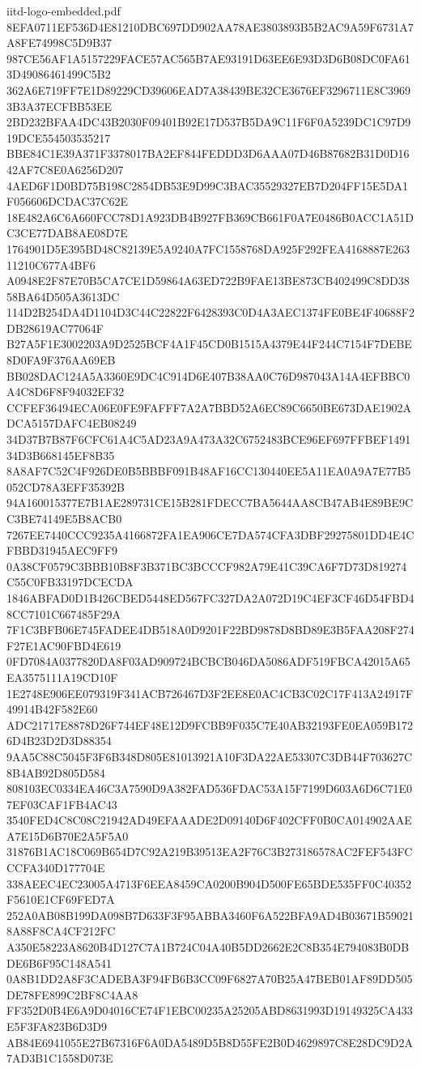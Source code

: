 \begin{filecontents*}[overwrite]{iitd-logo-embedded.pdf}
8EFA0711EF536D4E81210DBC697DD902AA78AE3803893B5B2AC9A59F6731A7A8FE74998C5D9B37
987CE56AF1A5157229FACE57AC565B7AE93191D63EE6E93D3D6B08DC0FA613D49086461499C5B2
362A6E719FF7E1D89229CD39606EAD7A38439BE32CE3676EF3296711E8C39693B3A37ECFBB53EE
2BD232BFAA4DC43B2030F09401B92E17D537B5DA9C11F6F0A5239DC1C97D919DCE554503535217
BBE84C1E39A371F3378017BA2EF844FEDDD3D6AAA07D46B87682B31D0D1642AF7C8E0A6256D207
4AED6F1D0BD75B198C2854DB53E9D99C3BAC35529327EB7D204FF15E5DA1F056606DCDAC37C62E
18E482A6C6A660FCC78D1A923DB4B927FB369CB661F0A7E0486B0ACC1A51DC3CE77DAB8AE08D7E
1764901D5E395BD48C82139E5A9240A7FC1558768DA925F292FEA4168887E26311210C677A4BF6
A0948E2F87E70B5CA7CE1D59864A63ED722B9FAE13BE873CB402499C8DD3858BA64D505A3613DC
114D2B254DA4D1104D3C44C22822F6428393C0D4A3AEC1374FE0BE4F40688F2DB28619AC77064F
B27A5F1E3002203A9D2525BCF4A1F45CD0B1515A4379E44F244C7154F7DEBE8D0FA9F376AA69EB
BB028DAC124A5A3360E9DC4C914D6E407B38AA0C76D987043A14A4EFBBC0A4C8D6F8F94032EF32
CCFEF36494ECA06E0FE9FAFFF7A2A7BBD52A6EC89C6650BE673DAE1902ADCA5157DAFC4EB08249
34D37B7B87F6CFC61A4C5AD23A9A473A32C6752483BCE96EF697FFBEF149134D3B668145EF8B35
8A8AF7C52C4F926DE0B5BBBF091B48AF16CC130440EE5A11EA0A9A7E77B5052CD78A3EFF35392B
94A160015377E7B1AE289731CE15B281FDECC7BA5644AA8CB47AB4E89BE9CC3BE74149E5B8ACB0
7267EE7440CCC9235A4166872FA1EA906CE7DA574CFA3DBF29275801DD4E4CFBBD31945AEC9FF9
0A38CF0579C3BBB10B8F3B371BC3BCCCF982A79E41C39CA6F7D73D819274C55C0FB33197DCECDA
1846ABFAD0D1B426CBED5448ED567FC327DA2A072D19C4EF3CF46D54FBD48CC7101C667485F29A
7F1C3BFB06E745FADEE4DB518A0D9201F22BD9878D8BD89E3B5FAA208F274F27E1AC90FBD4E619
0FD7084A0377820DA8F03AD909724BCBCB046DA5086ADF519FBCA42015A65EA3575111A19CD10F
1E2748E906EE079319F341ACB726467D3F2EE8E0AC4CB3C02C17F413A24917F49914B42F582E60
ADC21717E8878D26F744EF48E12D9FCBB9F035C7E40AB32193FE0EA059B1726D4B23D2D3D88354
9AA5C88C5045F3F6B348D805E81013921A10F3DA22AE53307C3DB44F703627C8B4AB92D805D584
808103EC0334EA46C3A7590D9A382FAD536FDAC53A15F7199D603A6D6C71E07EF03CAF1FB4AC43
3540FED4C8C08C21942AD49EFAAADE2D09140D6F402CFF0B0CA014902AAEA7E15D6B70E2A5F5A0
31876B1AC18C069B654D7C92A219B39513EA2F76C3B273186578AC2FEF543FCCCFA340D177704E
338AEEC4EC23005A4713F6EEA8459CA0200B904D500FE65BDE535FF0C40352F5610E1CF69FED7A
252A0AB08B199DA098B7D633F3F95ABBA3460F6A522BFA9AD4B03671B590218A88F8CA4CF212FC
A350E58223A8620B4D127C7A1B724C04A40B5DD2662E2C8B354E794083B0DBDE6B6F95C148A541
0A8B1DD2A8F3CADEBA3F94FB6B3CC09F6827A70B25A47BEB01AF89DD505DE78FE899C2BF8C4AA8
FF352D0B4E6A9D04016CE74F1EBC00235A25205ABD8631993D19149325CA433E5F3FA823B6D3D9
AB84E6941055E27B67316F6A0DA5489D5B8D55FE2B0D4629897C8E28DC9D2A7AD3B1C1558D073E

\end{filecontents*}
